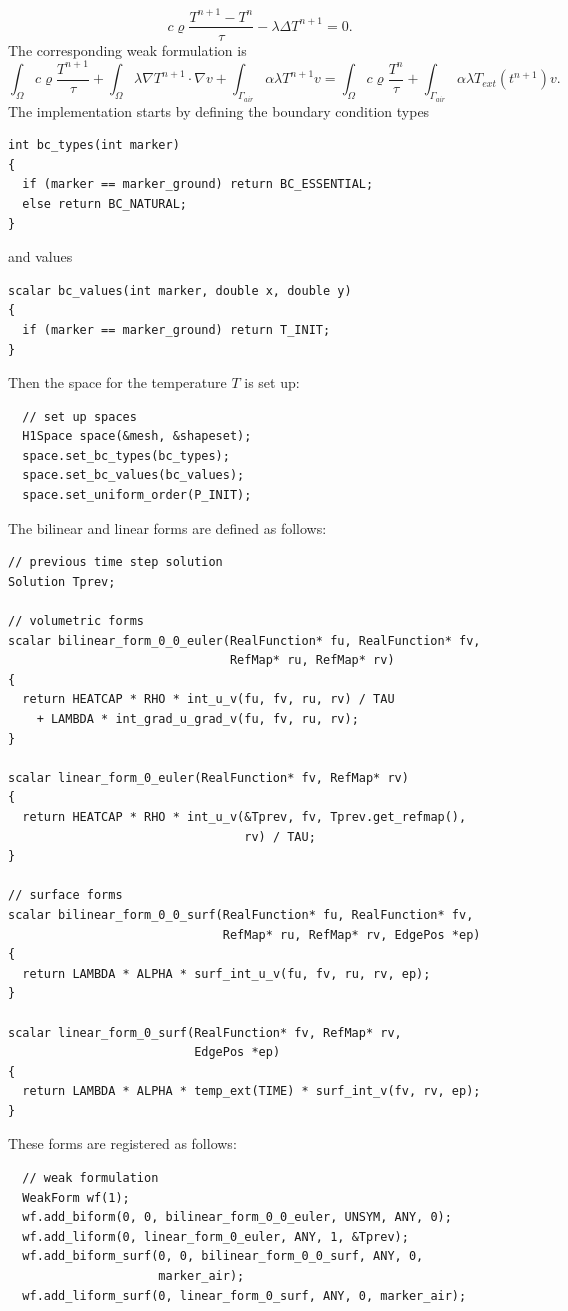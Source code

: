 \documentclass[11pt]{article}
\begin{document}
$$
c \varrho\frac{T^{n+1} - T^n}{\tau} - \lambda \Delta T^{n+1} = 0.
$$
The corresponding weak formulation is
$$
\int_{\Omega} c \varrho\frac{T^{n+1}}{\tau} + \int_{\Omega} \lambda \nabla T^{n+1}\cdot \nabla v
+ \int_{\Gamma_{air}} \alpha \lambda T^{n+1}v = \int_{\Omega} c \varrho\frac{T^{n}}{\tau}
+ \int_{\Gamma_{air}} \alpha \lambda T_{ext}(t^{n+1})v.
$$
The implementation starts by defining the
boundary condition types
\begin{lstlisting}
int bc_types(int marker)
{
  if (marker == marker_ground) return BC_ESSENTIAL;
  else return BC_NATURAL;
}
\end{lstlisting}
and values
\begin{lstlisting}
scalar bc_values(int marker, double x, double y)
{
  if (marker == marker_ground) return T_INIT;
}
\end{lstlisting}
Then the space for the temperature $T$ is set up:
\begin{lstlisting}
  // set up spaces
  H1Space space(&mesh, &shapeset);
  space.set_bc_types(bc_types);
  space.set_bc_values(bc_values);
  space.set_uniform_order(P_INIT);
\end{lstlisting}

The bilinear and linear forms are defined as follows:
\begin{lstlisting}
// previous time step solution
Solution Tprev;

// volumetric forms
scalar bilinear_form_0_0_euler(RealFunction* fu, RealFunction* fv,
                               RefMap* ru, RefMap* rv)
{
  return HEATCAP * RHO * int_u_v(fu, fv, ru, rv) / TAU
    + LAMBDA * int_grad_u_grad_v(fu, fv, ru, rv);
}

scalar linear_form_0_euler(RealFunction* fv, RefMap* rv)
{
  return HEATCAP * RHO * int_u_v(&Tprev, fv, Tprev.get_refmap(),
                                 rv) / TAU;
}

// surface forms
scalar bilinear_form_0_0_surf(RealFunction* fu, RealFunction* fv,
                              RefMap* ru, RefMap* rv, EdgePos *ep)
{
  return LAMBDA * ALPHA * surf_int_u_v(fu, fv, ru, rv, ep);
}

scalar linear_form_0_surf(RealFunction* fv, RefMap* rv,
                          EdgePos *ep)
{
  return LAMBDA * ALPHA * temp_ext(TIME) * surf_int_v(fv, rv, ep);
}
\end{lstlisting}
These forms are registered as follows:
\begin{lstlisting}
  // weak formulation
  WeakForm wf(1);
  wf.add_biform(0, 0, bilinear_form_0_0_euler, UNSYM, ANY, 0);
  wf.add_liform(0, linear_form_0_euler, ANY, 1, &Tprev);
  wf.add_biform_surf(0, 0, bilinear_form_0_0_surf, ANY, 0,
                     marker_air);
  wf.add_liform_surf(0, linear_form_0_surf, ANY, 0, marker_air);
\end{lstlisting}
\end{document}
